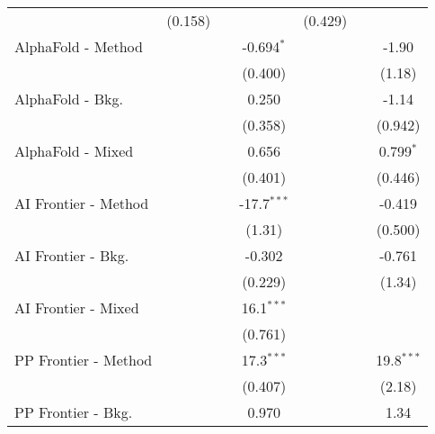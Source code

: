 \begin{tabular}{lcccccc}
                                  & (0.158)        &               &               & (0.429)        &              &   \\   
   AlphaFold - Method             &                &               & -0.694$^{*}$  &                &              & -1.90\\   
                                  &                &               & (0.400)       &                &              & (1.18)\\   
   AlphaFold - Bkg.               &                &               & 0.250         &                &              & -1.14\\   
                                  &                &               & (0.358)       &                &              & (0.942)\\   
   AlphaFold - Mixed              &                &               & 0.656         &                &              & 0.799$^{*}$\\   
                                  &                &               & (0.401)       &                &              & (0.446)\\   
   AI Frontier - Method           &                &               & -17.7$^{***}$ &                &              & -0.419\\   
                                  &                &               & (1.31)        &                &              & (0.500)\\   
   AI Frontier - Bkg.             &                &               & -0.302        &                &              & -0.761\\   
                                  &                &               & (0.229)       &                &              & (1.34)\\   
   AI Frontier - Mixed            &                &               & 16.1$^{***}$  &                &              &   \\   
                                  &                &               & (0.761)       &                &              &   \\   
   PP Frontier - Method           &                &               & 17.3$^{***}$  &                &              & 19.8$^{***}$\\   
                                  &                &               & (0.407)       &                &              & (2.18)\\   
   PP Frontier - Bkg.             &                &               & 0.970         &                &              & 1.34\\   

\end{tabular}
